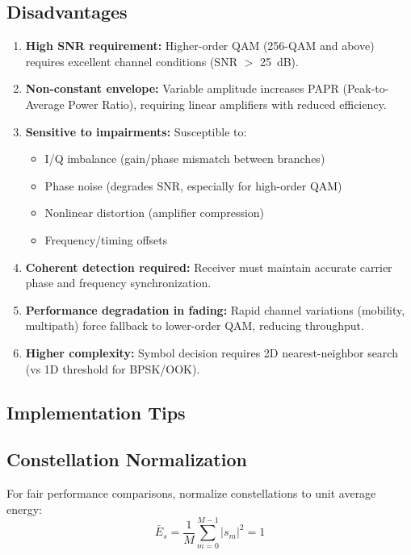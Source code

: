 \subsection*{Disadvantages}

\begin{enumerate}
\item \textbf{High SNR requirement:} Higher-order QAM (256-QAM and above) requires excellent channel conditions (SNR $>$ 25~dB).

\item \textbf{Non-constant envelope:} Variable amplitude increases PAPR (Peak-to-Average Power Ratio), requiring linear amplifiers with reduced efficiency.

\item \textbf{Sensitive to impairments:} Susceptible to:
  \begin{itemize}
  \item I/Q imbalance (gain/phase mismatch between branches)
  \item Phase noise (degrades SNR, especially for high-order QAM)
  \item Nonlinear distortion (amplifier compression)
  \item Frequency/timing offsets
  \end{itemize}

\item \textbf{Coherent detection required:} Receiver must maintain accurate carrier phase and frequency synchronization.

\item \textbf{Performance degradation in fading:} Rapid channel variations (mobility, multipath) force fallback to lower-order QAM, reducing throughput.

\item \textbf{Higher complexity:} Symbol decision requires 2D nearest-neighbor search (vs 1D threshold for BPSK/OOK).
\end{enumerate}

\subsection{Implementation Tips}

\subsection{Constellation Normalization}

For fair performance comparisons, normalize constellations to unit average energy:
\begin{equation}
\bar{E}_s = \frac{1}{M}\sum_{m=0}^{M-1} |s_m|^2 = 1
\label{eq:constellation-normalization}
\end{equation}

